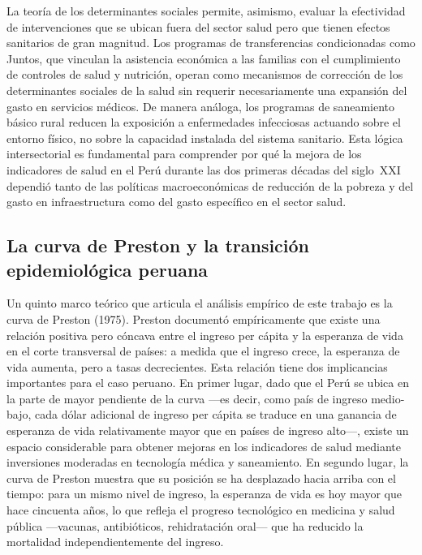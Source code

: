 \documentclass[12pt]{article}
\begin{document}
La teoría de los determinantes sociales permite, asimismo, evaluar la efectividad de intervenciones
que se ubican fuera del sector salud pero que tienen efectos sanitarios de gran magnitud. Los
programas de transferencias condicionadas como Juntos, que vinculan la asistencia económica a las
familias con el cumplimiento de controles de salud y nutrición, operan como mecanismos de
corrección de los determinantes sociales de la salud sin requerir necesariamente una expansión del
gasto en servicios médicos. De manera análoga, los programas de saneamiento básico rural reducen
la exposición a enfermedades infecciosas actuando sobre el entorno físico, no sobre la capacidad
instalada del sistema sanitario. Esta lógica intersectorial es fundamental para comprender por qué
la mejora de los indicadores de salud en el Perú durante las dos primeras décadas del siglo~XXI
dependió tanto de las políticas macroeconómicas de reducción de la pobreza y del gasto en
infraestructura como del gasto específico en el sector salud.

\subsection{La curva de Preston y la transición epidemiológica peruana}

Un quinto marco teórico que articula el análisis empírico de este trabajo es la curva de Preston
(1975). Preston documentó empíricamente que existe una relación positiva pero cóncava entre el
ingreso per cápita y la esperanza de vida en el corte transversal de países: a medida que el ingreso
crece, la esperanza de vida aumenta, pero a tasas decrecientes. Esta relación tiene dos implicancias
importantes para el caso peruano. En primer lugar, dado que el Perú se ubica en la parte de mayor
pendiente de la curva ---es decir, como país de ingreso medio-bajo, cada dólar adicional de ingreso
per cápita se traduce en una ganancia de esperanza de vida relativamente mayor que en países de
ingreso alto---, existe un espacio considerable para obtener mejoras en los indicadores de salud
mediante inversiones moderadas en tecnología médica y saneamiento. En segundo lugar, la curva de
Preston muestra que su posición se ha desplazado hacia arriba con el tiempo: para un mismo nivel
de ingreso, la esperanza de vida es hoy mayor que hace cincuenta años, lo que refleja el progreso
tecnológico en medicina y salud pública ---vacunas, antibióticos, rehidratación oral--- que ha
reducido la mortalidad independientemente del ingreso.
\end{document}
